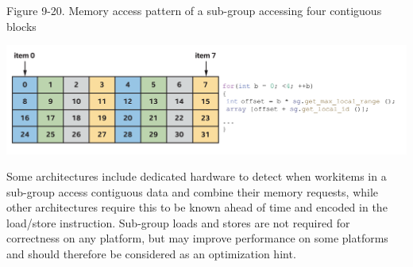 \hspace*{\fill} \par %
Figure 9-20. Memory access pattern of a sub-group accessing four contiguous blocks
\begin{center}
	\includegraphics[width=1.\textwidth]{content/chapter-9/images/13}
\end{center}

Some architectures include dedicated hardware to detect when workitems in a sub-group access contiguous data and combine their memory requests, while other architectures require this to be known ahead of time and encoded in the load/store instruction. Sub-group loads and stores are not required for correctness on any platform, but may improve performance on some platforms and should therefore be considered as an optimization hint.\par

































